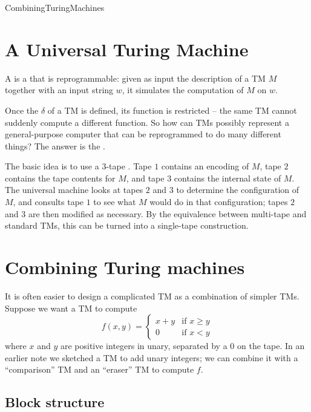 \documentclass[hidelinks]{article}
\begin{document}
\begin{smodule}[title={Further Turing Machine Models, and Combining Turing Machines}]{CombiningTuringMachines}
\section{A Universal Turing Machine}

\begin{sdefinition}[for=universal Turing machine]
A  is a  that is reprogrammable: given as input the description of a TM $M$ together with an input string $w$, it simulates the computation of $M$ on $w$.
\end{sdefinition}

Once the  $\delta$ of a TM is defined, its function is restricted -- the same TM cannot suddenly compute a different function. So how can TMs possibly represent a general-purpose computer that can be reprogrammed to do many different things? The answer is the .

The basic idea is to use a $3$-tape . Tape $1$ contains an encoding of $M$, tape $2$ contains the tape contents for $M$, and tape $3$ contains the internal state of $M$. The universal machine looks at tapes $2$ and $3$ to determine the configuration of $M$, and consults tape $1$ to see what $M$ would do in that configuration; tapes $2$ and $3$ are then modified as necessary. By the equivalence between multi-tape and standard TMs, this can be turned into a single-tape construction.

\section{Combining Turing machines}

It is often easier to design a complicated TM as a combination of simpler TMs. Suppose we want a TM to compute
\[
f(x, y) = \begin{cases} x + y & \text{if } x \geq y\\ 0 & \text{if } x < y \end{cases}
\]
where $x$ and $y$ are positive integers in unary, separated by a $0$ on the tape. In an earlier note we sketched a TM to add unary integers; we can combine it with a ``comparison'' TM and an ``eraser'' TM to compute $f$.

\subsection{Block structure}


\end{smodule}
\end{document}
